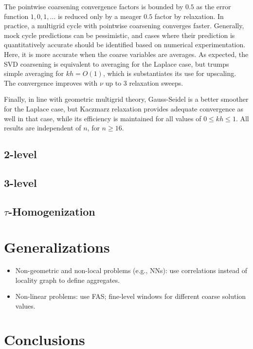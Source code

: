 \documentclass{article}
\begin{document}
The pointwise coarsening convergence factors is bounded by $0.5$ as the error function $1,0,1,\dots$ is reduced only by a meager $0.5$ factor by relaxation. In practice, a multigrid cycle with pointwise coarsening converges faster. Generally, mock cycle predictions can be pessimistic, and cases where their prediction is quantitatively accurate should be identified based on numerical experimentation. Here, it is more accurate when the coarse variables are averages. As expected, the SVD coarsening is equivalent to averaging for the Laplace case, but trumps simple averaging for $kh = O(1)$, which is substantiates its use for upscaling. The convergence improves with $\nu$ up to $3$ relaxation sweeps.

Finally, in line with geometric multigrid theory, Gauss-Seidel is a better smoother for the Laplace case, but Kaczmarz relaxation provides adequate convergence as well in that case, while its efficiency is maintained for all values of $0 \leq kh \leq 1$. All results are independent of $n$, for $n \geq 16$.

\subsection{2-level}

\subsection{3-level}

\subsection{$\tau$-Homogenization}

\section{Generalizations}
\begin{itemize}
	\item Non-geometric and non-local problems (e.g., NNs): use correlations instead of locality graph to define aggregates.
	\item Non-linear problems: use FAS; fine-level windows for different coarse solution values.
\end{itemize}

\section{Conclusions}
\end{document}
